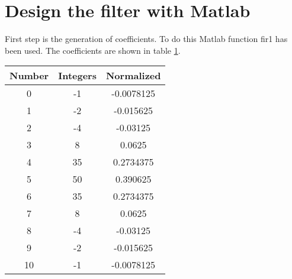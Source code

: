 \section{Design the filter with Matlab}

First step is the generation of coefficients. To do this Matlab function fir1 has been used.
The coefficients are shown in table \ref{tab:1}. %


\begin{table}%
\centering
\begin{tabular}{c|c|c}
\toprule
Number & Integers & Normalized \\
\midrule
0 & -1 & -0.0078125 \\
1 & -2 & -0.015625 \\
2 & -4 & -0.03125 \\
3 & 8 & 0.0625 \\
4 & 35 & 0.2734375 \\
5 & 50 & 0.390625 \\
6 & 35 & 0.2734375 \\
7 & 8 & 0.0625 \\
8 & -4 & -0.03125 \\
9 & -2 & -0.015625 \\
10 & -1 & -0.0078125 \\
\bottomrule
\end{tabular}
\label{tab:1}
\end{table}
